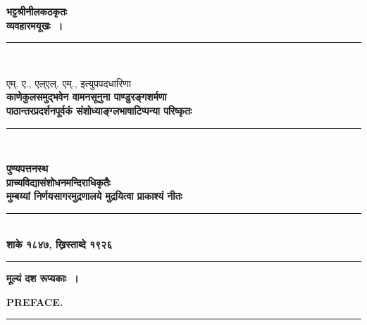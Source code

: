 \documentclass[11pt, openany]{book}
\begin{document}
\newpage
\thispagestyle{empty}
\begin{center}
\textbf{\LARGE भट्टश्रीनीलकठकृतः}\\

\vspace{5mm}
\textbf{\huge व्यवहारमयूखः~।}\\

\vspace*{\fill}
\onehalfspacing
\rule{0.4\linewidth}{0.5pt}\\
\vspace*{\fill}
\onehalfspacing

{\large एम्. ए., एल्एल्. एम्., इत्युपपदधारिणा}\\

\vspace{7mm}
\textbf{\Large काणेकुलसमुद्भवेन वामनसूनुना पाण्डुरङ्गशर्मणा}\\

\vspace{5mm}
\textbf{\Large पाठान्तरप्रदर्शनपूर्वकं संशोध्याङ्ग्लभाषाटिप्पन्या परिष्कृतः}\\

\vspace*{\fill}
\onehalfspacing
\rule{0.4\linewidth}{0.5pt}\\
\vspace*{\fill}
\onehalfspacing

\textbf{पुण्यपत्तनस्थ\textendash\ }\\

\vspace{7mm}
\textbf{\LARGE प्राच्यविद्यासंशोधनमन्दिराधिकृतैः}\\

\vspace{7mm}
\textbf{मुम्बय्यां निर्णयसागरमुद्रणालये मुद्रयित्वा प्राकाश्यं नीतः}\\

\vspace{7mm}
\rule{0.4\linewidth}{0.5pt}\\

\vspace{7mm}
\textbf{शाके १८४७, ख्रिस्ताब्दे १९२६}\\

\vspace{7mm}
\rule{0.4\linewidth}{0.5pt}

\vspace{7mm}
\textbf{\Large मूल्यं दश रूप्यकाः~।}
\end{center}

\newpage
\thispagestyle{empty}
\begin{center}
\textbf{\LARGE PREFACE.}\\

\vspace{4mm}
\rule{0.3\linewidth}{0.5pt}
\end{center}
\end{document}
